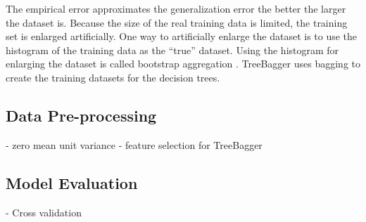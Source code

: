 The empirical error approximates the generalization error the better the larger the dataset is. Because the size of the real training data is limited, the training set is enlarged artificially. One way to artificially enlarge the dataset is to use the histogram of the training data as the ``true'' dataset. Using the histogram for enlarging the dataset is called bootstrap aggregation \cite{breiman:1996:bagging}. TreeBagger uses bagging to create the training datasets for the decision trees.

\subsection{Data Pre-processing}
  - zero mean unit variance
  - feature selection for TreeBagger

\subsection{Model Evaluation}
  - Cross validation

